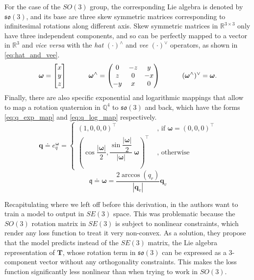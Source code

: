 For the case of the $SO(3)$ group, the corresponding Lie algebra is denoted by $\mathfrak{so}(3)$, and its base are three skew symmetric matrices corresponding to infinitesimal rotations along different axis.
Skew symmetric matrices in $\mathbb{R}^{3\!\times\!3}$ only have three independent components, and so can be perfectly mapped to a vector in $\mathbb{R}^3$ and \emph{vice versa} with the \emph{hat} $(\cdot)^{\wedge}$ and \emph{vee} $(\cdot)^{\vee}$ operators, as shown in \ref{eq:hat_and_vee}.
\begin{equation}\label{eq:hat_and_vee}
    \boldsymbol{\omega}=\begin{bmatrix}x\\y\\z\end{bmatrix}\rule{1cm}{0cm}\;
    \boldsymbol{\omega}^{\wedge}=\begin{pmatrix}0&-z&y\\z&0&-x\\-y&x&0\\\end{pmatrix}\rule{1cm}{0cm}\;
    ({\boldsymbol{\omega}}^\wedge)^\vee=\boldsymbol{\omega}.
\end{equation}
Finally, there are also specific exponential and logarithmic mappings that allow to map a rotation quaternion in $\mathbb{Q}^4$ to $\mathfrak{so}(3)$ and back, which have the forms \ref{eq:q_exp_map} and \ref{eq:q_log_map} respectively.
\begin{equation}\label{eq:q_exp_map}
    \mathbf{q}\doteq e_q^{\boldsymbol{\omega}}=\left\{ 
	\begin{array}{ll}
		(1,0,0,0)^\top  & \text{ , if }  \boldsymbol{\omega} = (0,0,0)^\top \\
		\left( \cos\dfrac{|\boldsymbol{\omega}|}{2}, \dfrac{\sin\dfrac{|\boldsymbol{\omega}|}{2}}{|\boldsymbol{\omega}|} ~ \boldsymbol{\omega} \right)^\top &  \text{ , otherwise}
	\end{array}
	\right.
\end{equation}
\begin{equation}\label{eq:q_log_map}
    \mathfrak{q}\doteq\boldsymbol{\omega}=\frac{2\arccos(q_r)}{|\mathbf{q}_v|}\mathbf{q}_v
\end{equation}

Recapitulating where we left off before this derivation, in \cite{DBLP:journals/corr/ClarkWWMT17} the authors want to train a model to output in $SE(3)$ space.
This was problematic because the $SO(3)$ rotation matrix in $SE(3)$ is subject to nonlinear constraints, which render any loss function to treat it very non-convex.
As a solution, they propose that the model predicts instead of the $SE(3)$ matrix, the Lie algebra representation of $\mathbf{T}$, whose rotation term in $\mathfrak{so}(3)$ can be expressed as a 3-component vector without any orthogonality constraints.
This makes the loss function significantly less nonlinear than when trying to work in $SO(3)$.

